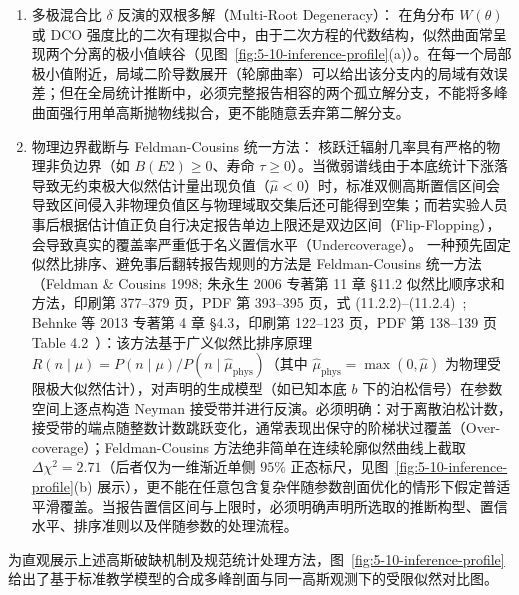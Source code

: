 \begin{enumerate}
\item 多极混合比 $\delta$ 反演的双根多解（Multi-Root Degeneracy）：
在角分布 $W(\theta)$ 或 DCO 强度比的二次有理拟合中，由于二次方程的代数结构，似然曲面常呈现两个分离的极小值峡谷（见图~\ref{fig:5-10-inference-profile}(a)）。在每一个局部极小值附近，局域二阶导数展开（轮廓曲率）可以给出该分支内的局域有效误差；但在全局统计推断中，必须完整报告相容的两个孤立解分支，不能将多峰曲面强行用单高斯抛物线拟合，更不能随意丢弃第二解分支。
\item 物理边界截断与 Feldman-Cousins 统一方法：
核跃迁辐射几率具有严格的物理非负边界（如 $B(E2) \ge 0$、寿命 $\tau \ge 0$）。当微弱谱线由于本底统计下涨落导致无约束极大似然估计量出现负值（$\widehat{\mu} < 0$）时，标准双侧高斯置信区间会导致区间侵入非物理负值区与物理域取交集后还可能得到空集；而若实验人员事后根据估计值正负自行决定报告单边上限还是双边区间（Flip-Flopping），会导致真实的覆盖率严重低于名义置信水平（Undercoverage）。
一种预先固定似然比排序、避免事后翻转报告规则的方法是 Feldman-Cousins 统一方法（Feldman \& Cousins 1998; 朱永生 2006 专著第 11 章 §11.2 似然比顺序求和方法，印刷第 377--379 页，PDF 第 393--395 页，式 (11.2.2)--(11.2.4)~\cite{book-zhu-probability-statistics-in-physics}; Behnke 等 2013 专著第 4 章 §4.3，印刷第 122--123 页，PDF 第 138--139 页 Table 4.2~\cite{book-behnke-data-analysis-hep}）：该方法基于广义似然比排序原理 $R(n \mid \mu) = P(n \mid \mu) / P(n \mid \hat{\mu}_{\mathrm{phys}})$（其中 $\hat{\mu}_{\mathrm{phys}} = \max(0, \hat{\mu})$ 为物理受限极大似然估计），对声明的生成模型（如已知本底 $b$ 下的泊松信号）在参数空间上逐点构造 Neyman 接受带并进行反演。必须明确：对于离散泊松计数，接受带的端点随整数计数跳跃变化，通常表现出保守的阶梯状过覆盖（Over-coverage）；Feldman-Cousins 方法绝非简单在连续轮廓似然曲线上截取 $\Delta\chi^2 = 2.71$（后者仅为一维渐近单侧 $95\%$ 正态标尺，见图~\ref{fig:5-10-inference-profile}(b) 展示），更不能在任意包含复杂伴随参数剖面优化的情形下假定普适平滑覆盖。当报告置信区间与上限时，必须明确声明所选取的推断构型、置信水平、排序准则以及伴随参数的处理流程。
\end{enumerate}

为直观展示上述高斯破缺机制及规范统计处理方法，图~\ref{fig:5-10-inference-profile} 给出了基于标准教学模型的合成多峰剖面与同一高斯观测下的受限似然对比图。

